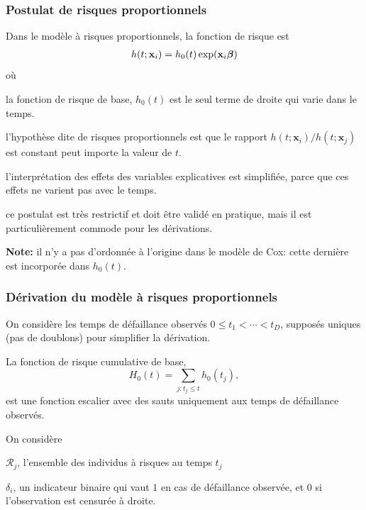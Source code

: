 \documentclass{beamer}
\begin{document}
\begin{frame}
\frametitle{Postulat de risques proportionnels}
Dans le modèle à risques proportionnels, la fonction de risque est
\begin{align*}
 h(t; \mathbf{x}_i) = h_0(t)\exp(\mathbf{x}_i\boldsymbol {\beta})
\end{align*}
où
\bi \item la fonction de risque de base, $h_0(t)$ est le seul terme de droite qui varie dans le temps.
\item l'hypothèse dite de \alert{risques proportionnels} est que le rapport $h(t; \mathbf{x}_i)/h(t; \mathbf{x}_j)$ est constant peut importe la valeur de $t$.
\item l'interprétation des effets des variables explicatives est simplifiée, parce que ces effets ne varient pas avec le temps.
\item ce postulat est très restrictif et doit être validé en pratique, mais il est particulièrement commode pour les dérivations.
\ei

\textbf{Note:} il n'y a pas d'ordonnée à l'origine dans le modèle de Cox: cette dernière est incorporée dans $h_0(t)$.
\end{frame}
\begin{frame}
 \frametitle{Dérivation du modèle à risques proportionnels}
 
On considère les temps de défaillance observés $0 \leq t_1 < \cdots < t_D$, supposés uniques (pas de doublons) pour simplifier la dérivation.


La fonction de risque cumulative de base,
\[
H_0(t) = \sum_{j: t_j \leq t} h_0(t_j),
\] est une fonction escalier avec des sauts uniquement aux temps de défaillance observés.

On considère 
\bi 
\item $\mathcal{R}_j$, l'ensemble des individus à risques au temps $t_j$
\item $\delta_i$, un indicateur binaire qui vaut $1$ en cas de défaillance observée, et $0$ si l'observation est censurée à droite.
\ei

\end{frame}
\end{document}
